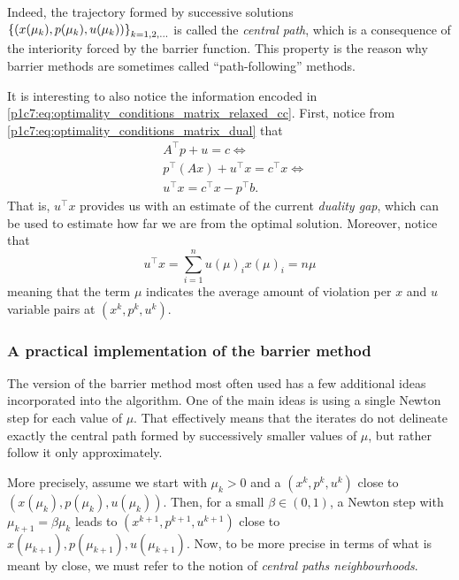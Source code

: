 Indeed, the trajectory formed by successive solutions $\left\{ (x(\mu_k), p(\mu_k), u(\mu_k)) \right \}_{k=1,2,\dots}$ is called the \emph{central path}, which is a consequence of the interiority forced by the barrier function. This property is the reason why barrier methods are sometimes called ``path-following'' methods.

It is interesting to also notice the information encoded in \eqref{p1c7:eq:optimality_conditions_matrix_relaxed_cc}. First, notice from \eqref{p1c7:eq:optimality_conditions_matrix_dual} that 
	\begin{align*}
		& A^\top p + u = c \Leftrightarrow \\	
		& p^\top (A x) + u^\top x = c^\top x  \Leftrightarrow  \\
		& u^\top x = c^\top x - p^\top b.
	\end{align*}
	That is, $u^\top x$ provides us with an estimate of the current \emph{duality gap}, which can be used to estimate how far we are from the optimal solution. Moreover, notice that
	$$
	u^\top x = \sum_{i =1}^n u(\mu)_i x(\mu)_i = n\mu 
	$$
	meaning that the term $\mu$ indicates the average amount of violation per $x$ and $u$ variable pairs at $(x^k, p^k, u^k)$. 


\subsubsection{A practical implementation of the barrier method}

The version of the barrier method most often used has a few additional ideas incorporated into the algorithm. One of the main ideas is using a single Newton step for each value of $\mu$. That effectively means that the iterates do not delineate exactly the central path formed by successively smaller values of $\mu$, but rather follow it only approximately. 

More precisely, assume we start with $\mu_k > 0$ and a $(x^k, p^k, u^k)$ close to $(x(\mu_k), p(\mu_k), u(\mu_k))$. Then, for a small $\beta \in (0,1)$, a Newton step with $\mu_{k+1} = \beta \mu_k$ leads to $(x^{k+1}, p^{k+1}, u^{k+1})$ close to $x(\mu_{k+1}), p(\mu_{k+1}), u(\mu_{k+1})$. Now, to be more precise in terms of what is meant by close, we must refer to the notion of \emph{central paths neighbourhoods}.

